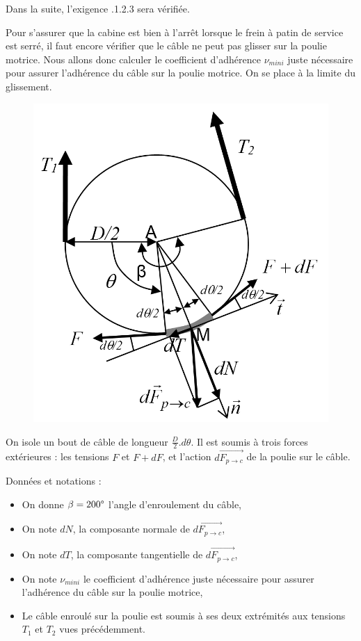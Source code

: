 Dans la suite, l'exigence .1.2.3 \fg sera vérifiée.

Pour s'assurer que la cabine est bien à l'arrêt lorsque le frein à patin de service est serré, il faut encore vérifier que le câble ne peut pas glisser sur la poulie motrice. Nous allons donc calculer le coefficient d'adhérence $\nu_{mini}$ juste nécessaire pour assurer l'adhérence du câble sur la poulie motrice. On se place à la limite du glissement.

\begin{figure}
	\vspace{-20pt}
	\centering \includegraphics[width=0.8\linewidth]{img/fig23}
	\label{fig23}
\end{figure}

On isole un bout de câble de longueur $\frac{D}{2}.d\theta$. Il est soumis à trois forces extérieures : les tensions $F$ et $F+dF$, et l'action $d\overrightarrow{F_{p\rightarrow c}}$  de la poulie sur le câble.

Données et notations :
\begin{itemize}
 \item On donne $\beta=200\degree$ l'angle d'enroulement du câble, 
 \item On note $dN$, la composante normale de $d\overrightarrow{F_{p\rightarrow c}}$,
 \item On note $dT$, la composante tangentielle de $d\overrightarrow{F_{p\rightarrow c}}$,
 \item On note $\nu_{mini}$ le coefficient d'adhérence juste nécessaire pour assurer l'adhérence du câble sur la poulie motrice,
 \item Le câble enroulé sur la poulie est soumis à ses deux extrémités aux tensions $T_1$ et $T_2$ vues précédemment.
\end{itemize}


